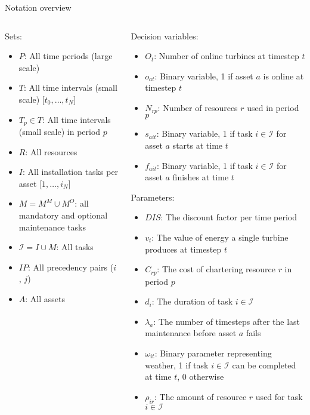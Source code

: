 \documentclass{beamer}
\begin{document}
\begin{frame}{Notation overview}
\tiny

\begin{columns}
\begin{column}{.48\textwidth}
Sets:
\begin{itemize}
\item $P$: All time periods (large scale)
\item $T$: All time intervals (small scale) [$t_0, \dots , t_N$]
\item $T_p \in T$: All time intervals (small scale) in period $p$
\item $R$: All resources
\item $I$: All installation tasks per asset [$1, \dots , i_N$]
\item $M = M^M \cup M^O$: all mandatory and optional maintenance tasks
\item $\mathcal{I} = I \cup M$: All tasks
\item $IP$: All precedency pairs ($i$, $j$)
\item $A$: All assets
\end{itemize}
\end{column}

\hfill

\begin{column}{.48\textwidth}
Decision variables:
\begin{itemize}
\item $O_{t}$: Number of online turbines at timestep $t$
\item $o_{at}$: Binary variable, 1 if asset $a$ is online at timestep $t$
\item $N_{rp}$: Number of resources $r$ used in period $p$
\item $s_{ait}$: Binary variable, 1 if task $i \in \mathcal{I}$ for asset $a$ starts at time $t$
\item $f_{ait}$: Binary variable, 1 if task $i \in \mathcal{I}$ for asset $a$ finishes at time $t$
\end{itemize}

Parameters:
\begin{itemize}
\item $DIS$: The discount factor per time period
\item $v_t$: The value of energy a single turbine produces at timestep $t$
\item $C_{rp}$: The cost of chartering resource $r$ in period $p$
\item $d_i$: The duration of task $i \in \mathcal{I}$
\item $\lambda_a$: The number of timesteps after the last maintenance before asset $a$ fails
\item $\omega_{it}$: Binary parameter representing weather, 1 if task $i \in \mathcal{I}$ can be completed at time $t$, 0 otherwise
\item $\rho_{ir}$: The amount of resource $r$ used for task $i \in \mathcal{I}$
\end{itemize}
\end{column}
\end{columns}

\end{frame}
\end{document}
